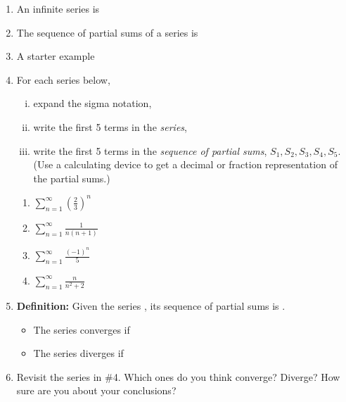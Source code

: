 \documentclass[11pt,fleqn]{article}
\begin{document}
\begin{enumerate}
\item An infinite series is 

\vfill

\item The sequence of partial sums of a series is

\vfill

\item A starter example

\vfill
\newpage

\item For each series below, 
	\begin{enumerate}[i.]
	\item expand the sigma notation,
	\item write the first 5 terms in the \emph{series},
	\item write the first 5 terms in the \emph{sequence of partial sums}, $S_1, S_2, S_3,S_4, S_5.$ (Use a calculating device to get a decimal or fraction representation of the partial sums.) 
	\end{enumerate}
	\begin{enumerate}
	\item $\displaystyle \sum_{n=1}^\infty \left( \frac{2}{3} \right)^n$
	\vfill
	\item $\displaystyle \sum_{n=1}^\infty  \frac{1}{n(n+1)} $
	\vfill
	\newpage
	\item $\displaystyle \sum_{n=1}^\infty  \frac{(-1)^n}{5}$
	\vfill
	\item $\displaystyle \sum_{n=1}^\infty  \frac{n}{n^2+2}$
	\vfill
	\end{enumerate}

\item \textbf{Definition:} Given the series \hspace{1in} , its sequence of partial sums is \hspace{1in}.\\
\begin{itemize}
	\item The series converges if \\
	
	\item The series diverges if \\
	
\end{itemize}

\item Revisit the series in \#4. Which ones do you think converge? Diverge? How sure are you about your conclusions?
\end{enumerate}
\end{document}
